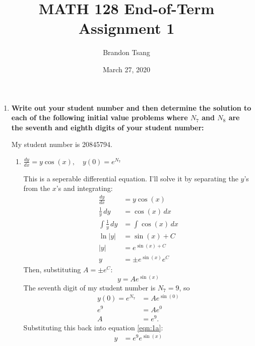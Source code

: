 \documentclass[11pt]{article}
\title{MATH 128 End-of-Term Assignment 1}
\author{Brandon Tsang}
\date{March 27, 2020}
\begin{document}
    \maketitle
    \begin{enumerate}[label={\textbf{\arabic*.}}]
        \item{
            \textbf{\boldmath Write out your student number and then determine the solution to each of the following initial value problems where $N_7$ and $N_8$ are the seventh and eighth digits of your student number:}
            \par
            My student number is 20845794.
            \begin{enumerate}[label={\textbf{(\alph*)}}]
                \item{
                    \textbf{\boldmath $\frac{dy}{dx}=y\cos(x),\quad y(0)=e^{N_7}$}
                    \par
                    This is a seperable differential equation. I'll solve it by separating the $y$'s from the $x$'s and integrating:
                    \begin{align*}
                        \frac{dy}{dx}&=y\cos(x) \\
                        \frac{1}{y}\,dy&=\cos(x)\,dx \\
                        \int\frac{1}{y}\,dy&=\int\cos(x)\,dx \\
                        \ln|y|&=\sin(x)+C \\
                        |y|&=e^{\sin(x)+C} \\
                        y&=\pm e^{\sin(x)}e^C
                    \end{align*}
                    Then, substituting $A=\pm e^C$:
                    \begin{equation}
                        y=Ae^{\sin(x)} \label{eqn:1a}
                    \end{equation}
                    The seventh digit of my student number is $N_7=9$, so
                    \begin{align*}
                        y(0)=e^{N_7}&=Ae^{\sin(0)} \\
                        e^9&=Ae^0 \\
                        A&=e^9.
                    \end{align*}
                    Substituting this back into equation \ref{eqn:1a}:
                    \begin{align*}
                        y&=e^9e^{\sin(x)} \\

\end{align*}}
\end{enumerate}}
\end{enumerate}
\end{document}
